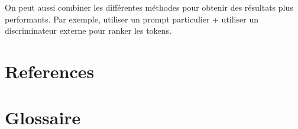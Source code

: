 \documentclass[9pt]{article}
\begin{document}
On peut aussi combiner les différentes méthodes pour obtenir des résultats plus performants. 
Par exemple, utiliser un prompt particulier + utiliser un discriminateur externe pour ranker les tokens. 







\newpage

\section{References}




\newpage
\section{Glossaire}
\printglossaries
\end{document}

